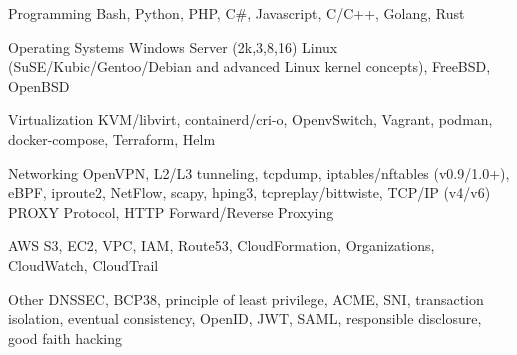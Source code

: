 
\begin{cvskills}

\cvskill
{Programming} 
{Bash, Python, PHP, C\#, Javascript, C/C++, Golang, Rust}

\cvskill
{Operating Systems} 
{Windows Server (2k,3,8,16) Linux (SuSE/Kubic/Gentoo/Debian and advanced Linux kernel concepts), FreeBSD, OpenBSD}

\cvskill
{Virtualization}
{KVM/libvirt, containerd/cri-o, OpenvSwitch, Vagrant, podman, docker-compose, Terraform, Helm}

\cvskill
{Networking} 
{OpenVPN, L2/L3 tunneling, tcpdump, iptables/nftables (v0.9/1.0+), eBPF, iproute2, NetFlow, scapy, hping3, tcpreplay/bittwiste, TCP/IP (v4/v6) PROXY Protocol, HTTP Forward/Reverse Proxying} 

\cvskill
{AWS}
{S3, EC2, VPC, IAM, Route53, CloudFormation, Organizations, CloudWatch, CloudTrail}

\cvskill
{Other}
{DNSSEC, BCP38, principle of least privilege, ACME, SNI, transaction isolation, eventual consistency, OpenID, JWT, SAML, responsible disclosure, good faith hacking}
\end{cvskills}

